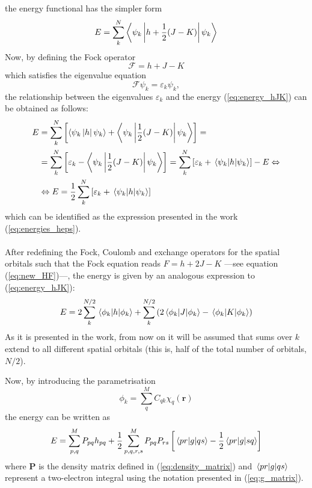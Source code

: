 the energy functional has the simpler form
\begin{equation}
    E=\sum_k^N\ev{\psi_k \left| h + \frac{1}{2}(J-K) \right| \psi_k}
    \label{eq:energy_hJK}
\end{equation}
Now, by defining the Fock operator
\begin{equation}
    \mathcal{F}=h+J-K
\end{equation}
which satisfies the eigenvalue equation
\begin{equation}
    \mathcal{F}\psi_k   = \varepsilon_k\psi_k,
\end{equation}
the relationship between the eigenvalues $\varepsilon_k$ and the energy (\ref{eq:energy_hJK}) can be obtained as follows:
\begin{align}
    E &= \sum_k^N\left[\ev{\psi_k \left| h\right| \psi_k}+\ev{\psi_k \left|\frac{1}{2}(J-K) \right| \psi_k}\right]=\nonumber\\&=\sum_k^N\left[\varepsilon_k-\ev{\psi_k \left|\frac{1}{2}(J-K) \right| \psi_k} \right]=\sum_k^N\left[\varepsilon_k+\mel{\psi_k}{h}{\psi_k} \right]-E\Leftrightarrow\nonumber\\&\Leftrightarrow E=\frac{1}{2}\sum_k^N\left[\varepsilon_k+\mel{\psi_k}{h}{\psi_k} \right]
    \label{eq:energyobtained}
\end{align}
which can be identified as the expression presented in the work (\ref{eq:energies_heps}).\\\\
After redefining the Fock, Coulomb and exchange operators for the spatial orbitals such that the Fock equation reads $F = h+2J-K$  ---see equation (\ref{eq:new_HF})---, the energy is given by an analogous expression to (\ref{eq:energy_hJK}):
\begin{equation}
    E = 2\sum_k^{N/2}\mel{\phi_k}{h}{\phi_k}+\sum_k^{N/2}\left(2\mel{\phi_k}{J}{\phi_k}-\mel{\phi_k}{K}{\phi_k}\right)
\end{equation}
As it is presented in the work, from now on it will be assumed that sums over $k$ extend to all different spatial orbitals (this is, half of the total number of orbitals, $N/2$).

Now, by introducing the parametrisation 
\begin{equation}
    \phi_k=\sum_{q}^MC_{qk}\chi_q(\mathbf{r})
    \label{eq:parametrisation}
\end{equation}
the energy can be written as
\begin{equation}
    E = \sum_{p,q}^MP_{pq} h_{pq} + \frac{1}{2}\sum_{p,q,r,s}^M P_{pq}P_{rs}\left[\mel{pr}{g}{qs}-\frac{1}{2}\mel{pr}{g}{sq}\right]
\end{equation}
where $\mathbf{P}$ is the density matrix defined in (\ref{eq:density_matrix}) and $\mel{pr}{g}{qs}$ represent a two-electron integral using the notation presented in (\ref{eq:g_matrix}).

